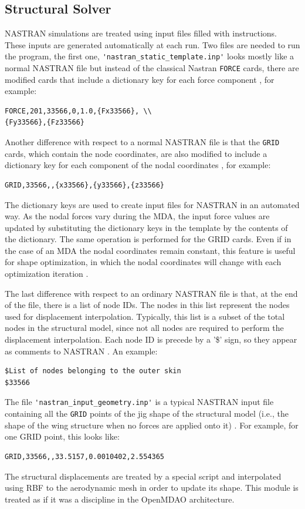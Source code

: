 \documentclass[conf]{new-aiaa}
\begin{document}
\subsection{Structural Solver}
NASTRAN simulations are treated using input files filled with instructions. These inputs are generated automatically at each run. Two files are needed to run the program, the first one, \verb|'nastran_static_template.inp'| looks mostly like a normal NASTRAN file but instead of the classical Nastran \verb|FORCE| cards, there are modified cards that include a dictionary key for each force component \cite{mascolomer:tel-02023612}, for example:
\begin{verbatim}
FORCE,201,33566,0,1.0,{Fx33566}, \\
{Fy33566},{Fz33566}
\end{verbatim}
Another difference with respect to a normal NASTRAN file is that the \verb|GRID| cards, which contain the node coordinates, are also modified to include a dictionary key for each component of the nodal coordinates \cite{mascolomer:tel-02023612}, for example:
\begin{verbatim}
GRID,33566,,{x33566},{y33566},{z33566}
\end{verbatim}
The dictionary keys are used to create input files for NASTRAN in an automated way. As the nodal forces vary during the MDA, the input force values are updated by substituting the dictionary keys in the template by the contents of the dictionary. The same operation is performed for the GRID cards. Even if in the case of an MDA the nodal coordinates remain constant, this feature is useful for shape optimization, in which the nodal coordinates will change with each optimization iteration \cite{mascolomer:tel-02023612}. \par
The last difference with respect to an ordinary NASTRAN file is that, at the end of the file, there is a list of node IDs. The nodes in this list represent the nodes used for displacement interpolation. Typically, this list is a subset of the total nodes in the structural model, since not all nodes are required to perform the displacement interpolation. Each node ID is precede by a '\$' sign, so they appear as comments to NASTRAN \cite{mascolomer:tel-02023612}. An example:
\begin{verbatim}
$List of nodes belonging to the outer skin
$33566
\end{verbatim}
The file \verb|'nastran_input_geometry.inp'| is a typical NASTRAN input file containing all the \verb|GRID| points of the jig shape of the structural model (i.e., the shape of the wing structure when no forces are applied onto it) \cite{mascolomer:tel-02023612}. For example, for one GRID point, this looks like:
\begin{verbatim}
GRID,33566,,33.5157,0.0010402,2.554365
\end{verbatim}
The structural displacements are treated by a special script and interpolated using RBF to the aerodynamic mesh in order to update its shape. This module is treated as if it was a discipline in the OpenMDAO architecture.  
\end{document}
